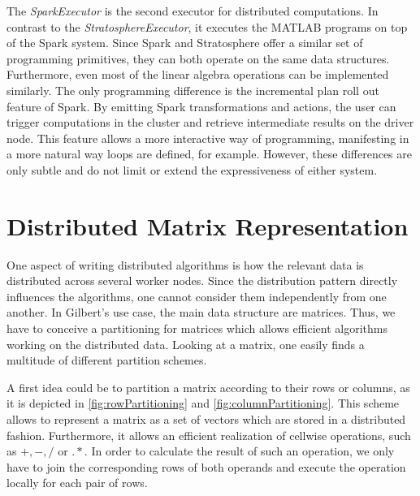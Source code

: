 The \emph{SparkExecutor} is the second executor for distributed computations.
In contrast to the \emph{StratosphereExecutor}, it executes the MATLAB programs on top of the Spark system.
Since Spark and Stratosphere offer a similar set of programming primitives, they can both operate on the same data structures.
Furthermore, even most of the linear algebra operations can be implemented similarly.
The only programming difference is the incremental plan roll out feature of Spark.
By emitting Spark transformations and actions, the user can trigger computations in the cluster and retrieve intermediate results on the driver node.
This feature allows a more interactive way of programming, manifesting in a more natural way loops are defined, for example.
However, these differences are only subtle and do not limit or extend the expressiveness of either system.

\section{Distributed Matrix Representation}
\label{sec:DistributedMatrixRepresentation}

One aspect of writing distributed algorithms is how the relevant data is distributed across several worker nodes.
Since the distribution pattern directly influences the algorithms, one cannot consider them independently from one another.
In Gilbert's use case, the main data structure are matrices.
Thus, we have to conceive a partitioning for matrices which allows efficient algorithms working on the distributed data.
Looking at a matrix, one easily finds a multitude of different partition schemes.

A first idea could be to partition a matrix according to their rows or columns, as it is depicted in \cref{fig:rowPartitioning} and \cref{fig:columnPartitioning}.
This scheme allows to represent a matrix as a set of vectors which are stored in a distributed fashion.
Furthermore, it allows an efficient realization of cellwise operations, such as $+,-,/$ or $.*$.
In order to calculate the result of such an operation, we only have to join the corresponding rows of both operands and execute the operation locally for each pair of rows.


